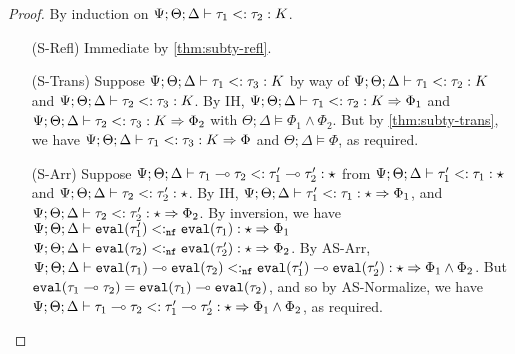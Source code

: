 \begin{proof}
By induction on $\Psi ; \Theta ; \Delta \vdash \tau_1 <: \tau_2 : K$.
 \begin{itemize}
   \item[(S-Refl)] Immediate by \autoref{thm:subty-refl}.
   \item[(S-Trans)] Suppose $\Psi ; \Theta ; \Delta \vdash \tau_1 <: \tau_3 : K$ by way of $\Psi ; \Theta ; \Delta \vdash \tau_1 <: \tau_2 : K$ and $\Psi ; \Theta ; \Delta \vdash \tau_2 <: \tau_3 : K$. By IH, $\Psi ; \Theta ; \Delta \vdash \tau_1 <: \tau_2 : K \Rightarrow \Phi_1$ and $\Psi ; \Theta ; \Delta \vdash \tau_2 <: \tau_3 : K \Rightarrow \Phi_2$ with $\Theta ; \Delta \vDash \Phi_1 \wedge \Phi_2$. But by \autoref{thm:subty-trans}, we have
   $\Psi ; \Theta ; \Delta \vdash \tau_1 <: \tau_3 : K \Rightarrow \Phi$ and $\Theta ; \Delta \vDash \Phi$, as required.
   \item[(S-Arr)] Suppose $\Psi ; \Theta ; \Delta \vdash \tau_1 \multimap \tau_2 <: \tau_1' \multimap \tau_2' : \star$
   from $\Psi ; \Theta ; \Delta \vdash \tau_1' <: \tau_1 : \star$ and
   $\Psi ; \Theta ; \Delta \vdash \tau_2 <: \tau_2' : \star$.
   By IH, $\Psi ; \Theta ; \Delta \vdash \tau_1' <: \tau_1 : \star \Rightarrow \Phi_1$,
   and $\Psi ; \Theta ; \Delta \vdash \tau_2 <: \tau_2' : \star \Rightarrow \Phi_2$.
   By inversion, we have $\Psi ; \Theta ; \Delta \vdash \texttt{eval}(\tau_1') <:_{\texttt{nf}} \texttt{eval}(\tau_1) : \star \Rightarrow \Phi_1$
   $\Psi ; \Theta ; \Delta \vdash \texttt{eval}(\tau_2) <:_{\texttt{nf}} \texttt{eval}(\tau_2') : \star \Rightarrow \Phi_2$.
   By AS-Arr,
   $\Psi ; \Theta ; \Delta \vdash \texttt{eval}(\tau_1) \multimap \texttt{eval}(\tau_2) <:_{\texttt{nf}} \texttt{eval}(\tau_1') \multimap \texttt{eval}(\tau_2') : \star \Rightarrow \Phi_1 \wedge \Phi_2$. But $\texttt{eval}(\tau_1 \multimap \tau_2) = \texttt{eval}(\tau_1) \multimap \texttt{eval}(\tau_2)$, and so by AS-Normalize, we have
   $\Psi ; \Theta ; \Delta \vdash \tau_1 \multimap \tau_2 <: \tau_1' \multimap \tau_2' : \star \Rightarrow \Phi_1 \wedge \Phi_2$, as required.
   

\end{itemize}
\end{proof}
